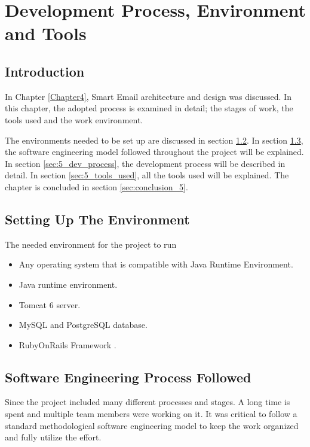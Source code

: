 
\chapter{Development Process, Environment and Tools} %

\label{Chapter5} %


\section{Introduction}
In Chapter \ref{Chapter4}, Smart Email architecture and design was discussed. In this chapter, 
the adopted process is examined in detail; the stages of work, the tools used 
and the work environment.

The environments needed to be set up are discussed in section \ref{sec:5_setting_up_env}.
In section \ref{sec:5_sw_eng_process_followed}, 
the software engineering model followed throughout the project will be explained. 
In section \ref{sec:5_dev_process}, the development process will be described in detail. In section \ref{sec:5_tools_used}, 
all the tools used will be explained. The chapter is concluded in section \ref{sec:conclusion_5}.
\section{Setting Up The Environment}
\label{sec:5_setting_up_env}
The needed environment for the project to run
\begin{itemize}
  \item Any operating system that is compatible with Java Runtime Environment.
  \item Java runtime environment.
  \item Tomcat 6 server.
  \item MySQL and PostgreSQL database.
  \item RubyOnRails Framework \cite{ROR}.
\end{itemize}

\section{Software Engineering Process Followed}
\label{sec:5_sw_eng_process_followed}
Since the project included many different processes and stages. A long time is 
spent and multiple team members were working on it. It was critical to follow 
a standard methodological software engineering model to keep the work organized 
and fully utilize the effort.

